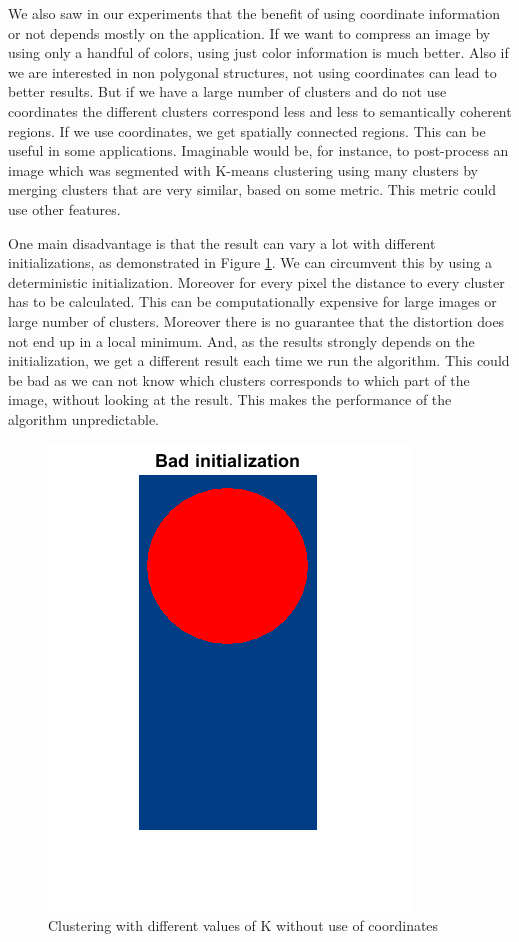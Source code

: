 We also saw in our experiments that the benefit of using coordinate information or not depends mostly on the application. If we want to compress an image by using only a handful of colors, using just color information is much better. Also if we are interested in non polygonal structures, not using coordinates can lead to better results. But if we have a large number of clusters and do not use coordinates the different clusters correspond less and less to semantically coherent regions. If we use coordinates, we get spatially connected regions. This can be useful in some applications. Imaginable would be, for instance, to post-process an image which was segmented with K-means clustering using many clusters by merging clusters that are very similar, based on some metric. This metric could use other features.

One main disadvantage is that the result can vary a lot with different initializations, as demonstrated in Figure \ref{fig:simple:badinit}. We can circumvent this by using a deterministic initialization. Moreover for every pixel the distance to every cluster has to be calculated. This can be computationally expensive for large images or large number of clusters. Moreover there is no guarantee that the distortion does not end up in a local minimum. And, as the results strongly depends on the initialization, we get a different result each time we run the algorithm. This could be bad as we can not know which clusters corresponds to which part of the image, without looking at the result. This makes the performance of the algorithm unpredictable.

\begin{figure}[h!]
\centering
\includegraphics[width =0.5\linewidth]{figures/task2/bad_initialization.png}
\caption{Clustering with different values of K without use of coordinates}
\label{fig:simple:badinit}
\end{figure}